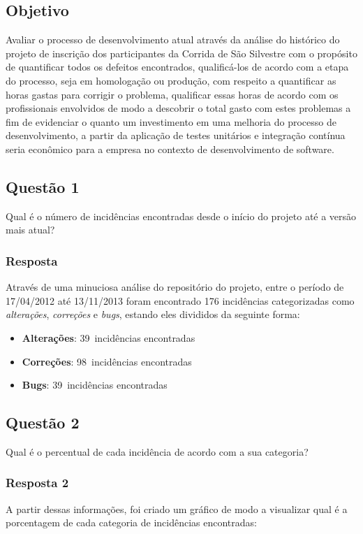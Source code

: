 \documentclass[11pt, a4paper]{article}
\begin{document}
\subsection{Objetivo}
Avaliar o processo de desenvolvimento atual através da análise do histórico do projeto de inscrição dos participantes da Corrida de São Silvestre com o propósito de quantificar todos os defeitos encontrados, qualificá-los de acordo com a etapa do processo, seja em homologação ou produção, com respeito a quantificar as horas gastas para corrigir o problema, qualificar essas horas de acordo com os profissionais envolvidos de modo a descobrir o total gasto com estes problemas a fim de evidenciar o quanto um investimento em uma melhoria do processo de desenvolvimento, a partir da aplicação de testes unitários e integração contínua seria econômico para a empresa no contexto de desenvolvimento de software.

\subsection{Questão 1}
Qual é o número de incidências encontradas desde o início do projeto até a versão mais atual?

\subsubsection{Resposta}
Através de uma minuciosa análise do repositório do projeto, entre o período de 17/04/2012 até 13/11/2013 foram encontrado 176 incidências categorizadas como \textit{alterações}, \textit{correções} e \textit{bugs}, estando eles divididos da seguinte forma:

\newcommand{\alteracoes}{39}
\newcommand{\correcoes}{98}
\newcommand{\bugs}{39}

\begin{itemize}
	\item \textbf{Alterações}: \alteracoes~incidências encontradas
	\item \textbf{Correções}: \correcoes~incidências encontradas
	\item \textbf{Bugs}: \bugs~incidências encontradas
\end{itemize}

\subsection{Questão 2}
Qual é o percentual de cada incidência de acordo com a sua categoria?

\subsubsection{Resposta 2}
A partir dessas informações, foi criado um gráfico de modo a visualizar qual é a porcentagem de cada categoria de incidências encontradas:
\end{document}
